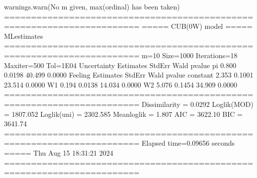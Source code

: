 \documentclass[letterpaper,10pt,english]{sphinxmanual}
\begin{document}
\begin{sphinxVerbatim}[commandchars=\\\{\}]
warnings.warn(\PYGZdq{}No m given, max(ordinal) has been taken\PYGZdq{})
=======================================================================
=====\PYGZgt{}\PYGZgt{}\PYGZgt{} CUB(0W) model \PYGZlt{}\PYGZlt{}\PYGZlt{}===== ML\PYGZhy{}estimates
=======================================================================
m=10  Size=1000  Iterations=18  Maxiter=500  Tol=1E\PYGZhy{}04
\PYGZhy{}\PYGZhy{}\PYGZhy{}\PYGZhy{}\PYGZhy{}\PYGZhy{}\PYGZhy{}\PYGZhy{}\PYGZhy{}\PYGZhy{}\PYGZhy{}\PYGZhy{}\PYGZhy{}\PYGZhy{}\PYGZhy{}\PYGZhy{}\PYGZhy{}\PYGZhy{}\PYGZhy{}\PYGZhy{}\PYGZhy{}\PYGZhy{}\PYGZhy{}\PYGZhy{}\PYGZhy{}\PYGZhy{}\PYGZhy{}\PYGZhy{}\PYGZhy{}\PYGZhy{}\PYGZhy{}\PYGZhy{}\PYGZhy{}\PYGZhy{}\PYGZhy{}\PYGZhy{}\PYGZhy{}\PYGZhy{}\PYGZhy{}\PYGZhy{}\PYGZhy{}\PYGZhy{}\PYGZhy{}\PYGZhy{}\PYGZhy{}\PYGZhy{}\PYGZhy{}\PYGZhy{}\PYGZhy{}\PYGZhy{}\PYGZhy{}\PYGZhy{}\PYGZhy{}\PYGZhy{}\PYGZhy{}\PYGZhy{}\PYGZhy{}\PYGZhy{}\PYGZhy{}\PYGZhy{}\PYGZhy{}\PYGZhy{}\PYGZhy{}\PYGZhy{}\PYGZhy{}\PYGZhy{}\PYGZhy{}\PYGZhy{}\PYGZhy{}\PYGZhy{}\PYGZhy{}
Uncertainty
          Estimates  StdErr     Wald  p\PYGZhy{}value
pi            0.800  0.0198   40.499   0.0000
\PYGZhy{}\PYGZhy{}\PYGZhy{}\PYGZhy{}\PYGZhy{}\PYGZhy{}\PYGZhy{}\PYGZhy{}\PYGZhy{}\PYGZhy{}\PYGZhy{}\PYGZhy{}\PYGZhy{}\PYGZhy{}\PYGZhy{}\PYGZhy{}\PYGZhy{}\PYGZhy{}\PYGZhy{}\PYGZhy{}\PYGZhy{}\PYGZhy{}\PYGZhy{}\PYGZhy{}\PYGZhy{}\PYGZhy{}\PYGZhy{}\PYGZhy{}\PYGZhy{}\PYGZhy{}\PYGZhy{}\PYGZhy{}\PYGZhy{}\PYGZhy{}\PYGZhy{}\PYGZhy{}\PYGZhy{}\PYGZhy{}\PYGZhy{}\PYGZhy{}\PYGZhy{}\PYGZhy{}\PYGZhy{}\PYGZhy{}\PYGZhy{}\PYGZhy{}\PYGZhy{}\PYGZhy{}\PYGZhy{}\PYGZhy{}\PYGZhy{}\PYGZhy{}\PYGZhy{}\PYGZhy{}\PYGZhy{}\PYGZhy{}\PYGZhy{}\PYGZhy{}\PYGZhy{}\PYGZhy{}\PYGZhy{}\PYGZhy{}\PYGZhy{}\PYGZhy{}\PYGZhy{}\PYGZhy{}\PYGZhy{}\PYGZhy{}\PYGZhy{}\PYGZhy{}\PYGZhy{}
Feeling
          Estimates  StdErr     Wald  p\PYGZhy{}value
constant      2.353  0.1001   23.514   0.0000
W1            0.194  0.0138   14.034   0.0000
W2           \PYGZhy{}5.076  0.1454  \PYGZhy{}34.909   0.0000
=======================================================================
Dissimilarity = 0.0292
Loglik(MOD)   = \PYGZhy{}1807.052
Loglik(uni)   = \PYGZhy{}2302.585
Mean\PYGZhy{}loglik   = \PYGZhy{}1.807
\PYGZhy{}\PYGZhy{}\PYGZhy{}\PYGZhy{}\PYGZhy{}\PYGZhy{}\PYGZhy{}\PYGZhy{}\PYGZhy{}\PYGZhy{}\PYGZhy{}\PYGZhy{}\PYGZhy{}\PYGZhy{}\PYGZhy{}\PYGZhy{}\PYGZhy{}\PYGZhy{}\PYGZhy{}\PYGZhy{}\PYGZhy{}\PYGZhy{}\PYGZhy{}\PYGZhy{}\PYGZhy{}\PYGZhy{}\PYGZhy{}\PYGZhy{}\PYGZhy{}\PYGZhy{}\PYGZhy{}\PYGZhy{}\PYGZhy{}\PYGZhy{}\PYGZhy{}\PYGZhy{}\PYGZhy{}\PYGZhy{}\PYGZhy{}\PYGZhy{}\PYGZhy{}\PYGZhy{}\PYGZhy{}\PYGZhy{}\PYGZhy{}\PYGZhy{}\PYGZhy{}\PYGZhy{}\PYGZhy{}\PYGZhy{}\PYGZhy{}\PYGZhy{}\PYGZhy{}\PYGZhy{}\PYGZhy{}\PYGZhy{}\PYGZhy{}\PYGZhy{}\PYGZhy{}\PYGZhy{}\PYGZhy{}\PYGZhy{}\PYGZhy{}\PYGZhy{}\PYGZhy{}\PYGZhy{}\PYGZhy{}\PYGZhy{}\PYGZhy{}\PYGZhy{}\PYGZhy{}
AIC = 3622.10
BIC = 3641.74
=======================================================================
Elapsed time=0.09656 seconds =====\PYGZgt{}\PYGZgt{}\PYGZgt{} Thu Aug 15 18:31:21 2024
=======================================================================
\end{sphinxVerbatim}
\end{document}
